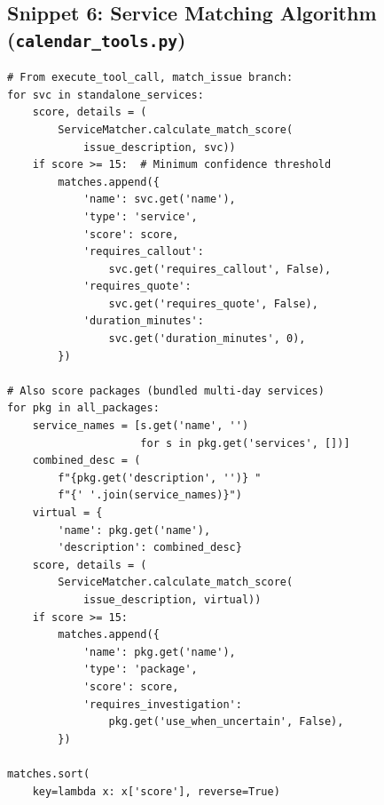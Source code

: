\documentclass[conference]{IEEEtran}
\begin{document}
\subsection*{Snippet 6: Service Matching Algorithm (\texttt{calendar\_tools.py})}
\begin{lstlisting}[caption={Service and package matching with confidence scoring}]
# From execute_tool_call, match_issue branch:
for svc in standalone_services:
    score, details = (
        ServiceMatcher.calculate_match_score(
            issue_description, svc))
    if score >= 15:  # Minimum confidence threshold
        matches.append({
            'name': svc.get('name'),
            'type': 'service',
            'score': score,
            'requires_callout':
                svc.get('requires_callout', False),
            'requires_quote':
                svc.get('requires_quote', False),
            'duration_minutes':
                svc.get('duration_minutes', 0),
        })

# Also score packages (bundled multi-day services)
for pkg in all_packages:
    service_names = [s.get('name', '')
                     for s in pkg.get('services', [])]
    combined_desc = (
        f"{pkg.get('description', '')} "
        f"{' '.join(service_names)}")
    virtual = {
        'name': pkg.get('name'),
        'description': combined_desc}
    score, details = (
        ServiceMatcher.calculate_match_score(
            issue_description, virtual))
    if score >= 15:
        matches.append({
            'name': pkg.get('name'),
            'type': 'package',
            'score': score,
            'requires_investigation':
                pkg.get('use_when_uncertain', False),
        })

matches.sort(
    key=lambda x: x['score'], reverse=True)
\end{lstlisting}

\end{document}
